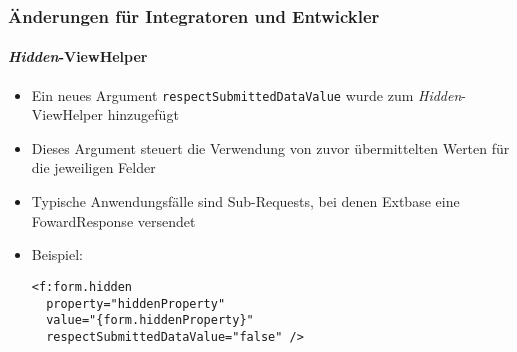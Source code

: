 %

\begin{frame}[fragile]
	\frametitle{Änderungen für Integratoren und Entwickler}
	\framesubtitle{\textit{Hidden}-ViewHelper}


	\begin{itemize}
		\item Ein neues Argument \texttt{respectSubmittedDataValue} wurde
			zum \textit{Hidden}-ViewHelper hinzugefügt
		\item Dieses Argument steuert die Verwendung von zuvor übermittelten
			Werten für die jeweiligen Felder
		\item Typische Anwendungsfälle sind Sub-Requests, bei denen Extbase eine
			FowardResponse versendet

		\item Beispiel:
\begin{lstlisting}
<f:form.hidden
  property="hiddenProperty"
  value="{form.hiddenProperty}"
  respectSubmittedDataValue="false" />
\end{lstlisting}

	\end{itemize}
\end{frame}

